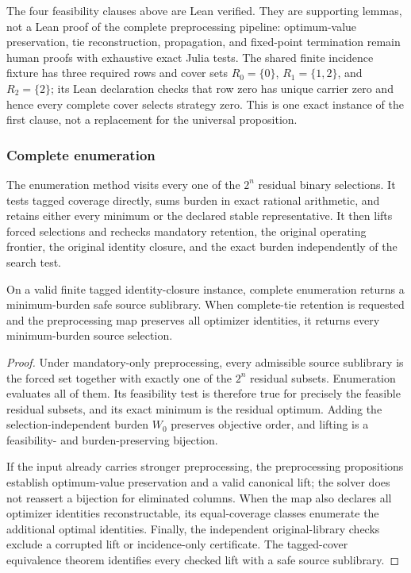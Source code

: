 The four feasibility clauses above are Lean verified.  They are supporting
lemmas, not a Lean proof of the complete preprocessing pipeline: optimum-value
preservation, tie reconstruction, propagation, and fixed-point termination
remain human proofs with exhaustive exact Julia tests.
The shared finite incidence fixture has three required rows and cover sets
\(R_0=\{0\}\), \(R_1=\{1,2\}\), and \(R_2=\{2\}\); its Lean declaration
checks that row zero has unique carrier zero and hence every complete cover
selects strategy zero.  This is one exact instance of the first clause, not a
replacement for the universal proposition.

\subsubsection{Complete enumeration}
The enumeration method visits every one of the $2^n$ residual binary
selections.  It tests tagged coverage directly, sums burden in exact rational
arithmetic, and retains either every minimum or the declared stable
representative.  It then lifts forced selections and rechecks mandatory
retention, the original operating frontier, the original identity closure, and
the exact burden independently of the search test.

\begin{proposition}
\label{prop:aor-complete-enumeration}
On a valid finite tagged identity-closure instance, complete enumeration
returns a minimum-burden safe source sublibrary.  When complete-tie retention
is requested and the preprocessing map preserves all optimizer identities, it
returns every minimum-burden source selection.
\end{proposition}

\begin{proof}
Under mandatory-only preprocessing, every admissible source sublibrary is the
forced set together with exactly one of the $2^n$ residual subsets.
Enumeration evaluates all of them.  Its feasibility test is therefore true
for precisely the feasible residual subsets, and its exact minimum is the
residual optimum.  Adding the selection-independent burden $W_0$ preserves
objective order, and lifting is a feasibility- and burden-preserving
bijection.

If the input already carries stronger preprocessing, the preprocessing
propositions establish optimum-value preservation and a valid canonical lift;
the solver does not reassert a bijection for eliminated columns.  When the map
also declares all optimizer identities reconstructable, its equal-coverage
classes enumerate the additional optimal identities.  Finally, the
independent original-library checks exclude a corrupted lift or incidence-only
certificate.  The tagged-cover equivalence theorem identifies every checked
lift with a safe source sublibrary.
\end{proof}

